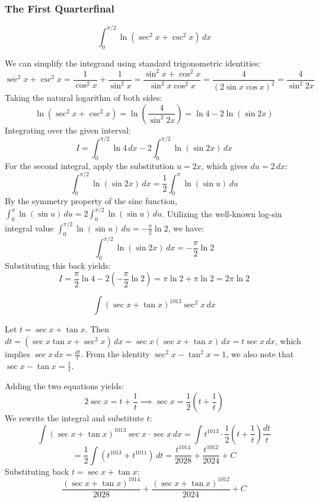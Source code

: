 \subsubsection*{The First Quarterfinal}
\begin{questions}
\question 
\[ \int_{0}^{\pi/2} \ln(\sec^{2}x + \csc^{2}x) \, dx \]
\begin{solution}
We can simplify the integrand using standard trigonometric identities:
\[ \sec^2 x + \csc^2 x = \frac{1}{\cos^2 x} + \frac{1}{\sin^2 x} = \frac{\sin^2 x + \cos^2 x}{\sin^2 x \cos^2 x} = \frac{4}{(2\sin x \cos x)^2} = \frac{4}{\sin^2 2x} \]
Taking the natural logarithm of both sides:
\[ \ln(\sec^2 x + \csc^2 x) = \ln\left(\frac{4}{\sin^2 2x}\right) = \ln 4 - 2\ln(\sin 2x) \]
Integrating over the given interval:
\[ I = \int_{0}^{\pi/2} \ln 4 \, dx - 2\int_{0}^{\pi/2} \ln(\sin 2x) \, dx \]
For the second integral, apply the substitution $u = 2x$, which gives $du = 2 \, dx$:
\[ \int_{0}^{\pi/2} \ln(\sin 2x) \, dx = \frac{1}{2} \int_{0}^{\pi} \ln(\sin u) \, du \]
By the symmetry property of the sine function, $\int_{0}^{\pi} \ln(\sin u) \, du = 2\int_{0}^{\pi/2} \ln(\sin u) \, du$. Utilizing the well-known log-sin integral value $\int_{0}^{\pi/2} \ln(\sin u) \, du = -\frac{\pi}{2}\ln 2$, we have:
\[ \int_{0}^{\pi/2} \ln(\sin 2x) \, dx = -\frac{\pi}{2}\ln 2 \]
Substituting this back yields:
\[ I = \frac{\pi}{2}\ln 4 - 2\left(-\frac{\pi}{2}\ln 2\right) = \pi\ln 2 + \pi\ln 2 = 2\pi\ln 2 \]
\end{solution}

\question 
\[ \int (\sec x + \tan x)^{1013} \sec^2 x \, dx \]
\begin{solution}
Let $t = \sec x + \tan x$. Then $dt = (\sec x \tan x + \sec^2 x) \, dx = \sec x (\sec x + \tan x) \, dx = t \sec x \, dx$, which implies $\sec x \, dx = \frac{dt}{t}$. From the identity $\sec^2 x - \tan^2 x = 1$, we also note that $\sec x - \tan x = \frac{1}{t}$. 

Adding the two equations yields:
\[ 2\sec x = t + \frac{1}{t} \implies \sec x = \frac{1}{2}\left(t + \frac{1}{t}\right) \]
We rewrite the integral and substitute $t$:
\[ \int (\sec x + \tan x)^{1013} \sec x \cdot \sec x \, dx = \int t^{1013} \cdot \frac{1}{2}\left(t + \frac{1}{t}\right) \frac{dt}{t} \]
\[ = \frac{1}{2} \int \left(t^{1013} + t^{1011}\right) \, dt = \frac{t^{1014}}{2028} + \frac{t^{1012}}{2024} + C \]
Substituting back $t = \sec x + \tan x$:
\[ \frac{(\sec x + \tan x)^{1014}}{2028} + \frac{(\sec x + \tan x)^{1012}}{2024} + C \]
\end{solution}


\end{questions}

